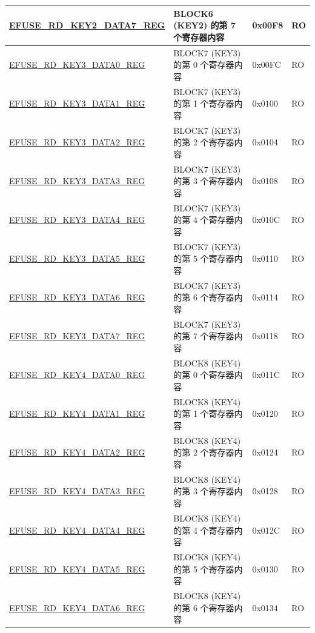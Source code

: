 \begin{longtable}{ | p{5.8cm} | p{7cm} | p{1.3cm} | p{1.2cm} | }
\hyperref[regdesc:EFUSERDKEY2DATA7REG]{EFUSE\_RD\_KEY2\_DATA7\_REG} & BLOCK6 (KEY2) 的第 7 个寄存器内容 & 0x00F8 & RO \\ \hline
\hyperref[regdesc:EFUSERDKEY3DATA0REG]{EFUSE\_RD\_KEY3\_DATA0\_REG} & BLOCK7 (KEY3) 的第 0 个寄存器内容 & 0x00FC & RO \\ \hline
\hyperref[regdesc:EFUSERDKEY3DATA1REG]{EFUSE\_RD\_KEY3\_DATA1\_REG} & BLOCK7 (KEY3) 的第 1 个寄存器内容 & 0x0100 & RO \\ \hline
\hyperref[regdesc:EFUSERDKEY3DATA2REG]{EFUSE\_RD\_KEY3\_DATA2\_REG} & BLOCK7 (KEY3) 的第 2 个寄存器内容 & 0x0104 & RO \\ \hline
\hyperref[regdesc:EFUSERDKEY3DATA3REG]{EFUSE\_RD\_KEY3\_DATA3\_REG} & BLOCK7 (KEY3) 的第 3 个寄存器内容 & 0x0108 & RO \\ \hline
\hyperref[regdesc:EFUSERDKEY3DATA4REG]{EFUSE\_RD\_KEY3\_DATA4\_REG} & BLOCK7 (KEY3) 的第 4 个寄存器内容 & 0x010C & RO \\ \hline
\hyperref[regdesc:EFUSERDKEY3DATA5REG]{EFUSE\_RD\_KEY3\_DATA5\_REG} & BLOCK7 (KEY3) 的第 5 个寄存器内容 & 0x0110 & RO \\ \hline
\hyperref[regdesc:EFUSERDKEY3DATA6REG]{EFUSE\_RD\_KEY3\_DATA6\_REG} & BLOCK7 (KEY3) 的第 6 个寄存器内容 & 0x0114 & RO \\ \hline
\hyperref[regdesc:EFUSERDKEY3DATA7REG]{EFUSE\_RD\_KEY3\_DATA7\_REG} & BLOCK7 (KEY3) 的第 7 个寄存器内容 & 0x0118 & RO \\ \hline
\hyperref[regdesc:EFUSERDKEY4DATA0REG]{EFUSE\_RD\_KEY4\_DATA0\_REG} & BLOCK8 (KEY4) 的第 0 个寄存器内容 & 0x011C & RO \\ \hline
\hyperref[regdesc:EFUSERDKEY4DATA1REG]{EFUSE\_RD\_KEY4\_DATA1\_REG} & BLOCK8 (KEY4) 的第 1 个寄存器内容 & 0x0120 & RO \\ \hline
\hyperref[regdesc:EFUSERDKEY4DATA2REG]{EFUSE\_RD\_KEY4\_DATA2\_REG} & BLOCK8 (KEY4) 的第 2 个寄存器内容 & 0x0124 & RO \\ \hline
\hyperref[regdesc:EFUSERDKEY4DATA3REG]{EFUSE\_RD\_KEY4\_DATA3\_REG} & BLOCK8 (KEY4) 的第 3 个寄存器内容 & 0x0128 & RO \\ \hline
\hyperref[regdesc:EFUSERDKEY4DATA4REG]{EFUSE\_RD\_KEY4\_DATA4\_REG} & BLOCK8 (KEY4) 的第 4 个寄存器内容 & 0x012C & RO \\ \hline
\hyperref[regdesc:EFUSERDKEY4DATA5REG]{EFUSE\_RD\_KEY4\_DATA5\_REG} & BLOCK8 (KEY4) 的第 5 个寄存器内容 & 0x0130 & RO \\ \hline
\hyperref[regdesc:EFUSERDKEY4DATA6REG]{EFUSE\_RD\_KEY4\_DATA6\_REG} & BLOCK8 (KEY4) 的第 6 个寄存器内容 & 0x0134 & RO \\ \hline

\end{longtable}
